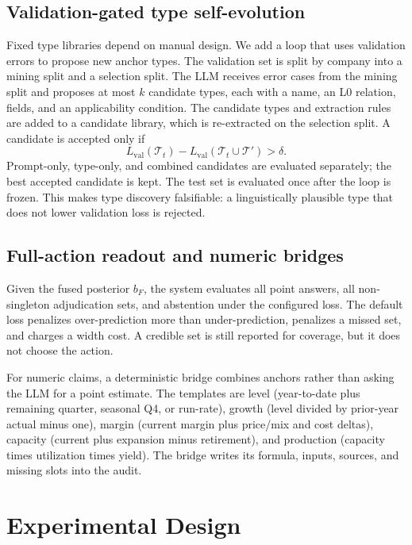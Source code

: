\documentclass[11pt]{article}
\begin{document}
\subsection{Validation-gated type self-evolution}
Fixed type libraries depend on manual design. We add a loop that uses validation errors to propose new anchor types. The validation set is split by company into a mining split and a selection split. The LLM receives error cases from the mining split and proposes at most $k$ candidate types, each with a name, an L0 relation, fields, and an applicability condition. The candidate types and extraction rules are added to a candidate library, which is re-extracted on the selection split. A candidate is accepted only if
\begin{equation}
L_{\mathrm{val}}(\mathcal T_t)-L_{\mathrm{val}}(\mathcal T_t\cup\mathcal T')>\delta.
\end{equation}
Prompt-only, type-only, and combined candidates are evaluated separately; the best accepted candidate is kept. The test set is evaluated once after the loop is frozen. This makes type discovery falsifiable: a linguistically plausible type that does not lower validation loss is rejected.

\subsection{Full-action readout and numeric bridges}
Given the fused posterior $b_F$, the system evaluates all point answers, all non-singleton adjudication sets, and abstention under the configured loss. The default loss penalizes over-prediction more than under-prediction, penalizes a missed set, and charges a width cost. A credible set is still reported for coverage, but it does not choose the action.

For numeric claims, a deterministic bridge combines anchors rather than asking the LLM for a point estimate. The templates are level (year-to-date plus remaining quarter, seasonal Q4, or run-rate), growth (level divided by prior-year actual minus one), margin (current margin plus price/mix and cost deltas), capacity (current plus expansion minus retirement), and production (capacity times utilization times yield). The bridge writes its formula, inputs, sources, and missing slots into the audit.

\section{Experimental Design}
\end{document}
